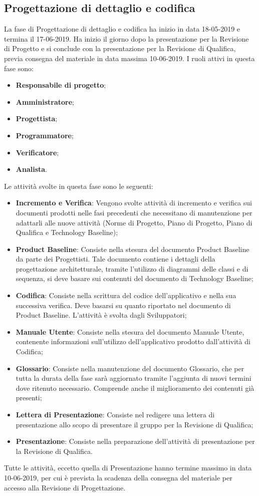 \subsection{Progettazione di dettaglio e codifica}
La fase di Progettazione di dettaglio e codifica ha inizio in data 18-05-2019 e termina il 17-06-2019. Ha inizio il giorno dopo la presentazione per la Revisione di Progetto e si conclude con la presentazione per la Revisione di Qualifica, previa consegna del materiale in data massima 10-06-2019. 
I ruoli attivi in questa fase sono:
\begin{itemize}
    \item \textbf{Responsabile di progetto};
    \item \textbf{Amministratore};
    \item \textbf{Progettista};
    \item \textbf{Programmatore};
    \item \textbf{Verificatore};
    \item\textbf{Analista}.
\end{itemize}
Le attività svolte in questa fase sono le seguenti:
\begin{itemize}
    \item \textbf{Incremento e Verifica}: Vengono svolte attività di incremento e verifica sui documenti prodotti nelle fasi precedenti che necessitano di manutenzione per adattarli alle nuove attività (Norme di Progetto, Piano di Progetto, Piano di Qualifica e Technology Baseline);
    \item \textbf{Product Baseline}: Consiste nella stesura del documento Product Baseline da parte dei Progettisti. Tale documento contiene i dettagli della progettazione architetturale, tramite l'utilizzo di diagrammi delle classi e di sequenza, si deve basare sui contenuti del documento di Technology Baseline;
    \item \textbf{Codifica}: Consiste nella scrittura del codice dell'applicativo e nella sua successiva verifica. Deve basarsi su quanto riportato nel documento di Product Baseline. L'attività è svolta dagli Sviluppatori;
    \item \textbf{Manuale Utente}: Consiste nella stesura del documento Manuale Utente, contenente informazioni sull'utilizzo dell'applicativo prodotto dall'attività di Codifica;
    \item \textbf{Glossario}: Consiste nella manutenzione del documento Glossario, che per tutta la durata della fase sarà aggiornato tramite l'aggiunta di nuovi termini dove ritenuto necessario. Comprende anche il miglioramento dei contenuti già presenti;
    \item \textbf{Lettera di Presentazione}: Consiste nel redigere una lettera di presentazione allo scopo di presentare il gruppo per la Revisione di Qualifica;
    \item \textbf{Presentazione}: Consiste nella preparazione dell'attività di presentazione per la Revisione di Qualifica.
\end{itemize}
Tutte le attività, eccetto quella di Presentazione hanno termine massimo in data 10-06-2019, per cui è prevista la scadenza della consegna del materiale per accesso alla Revisione di Progettazione.
